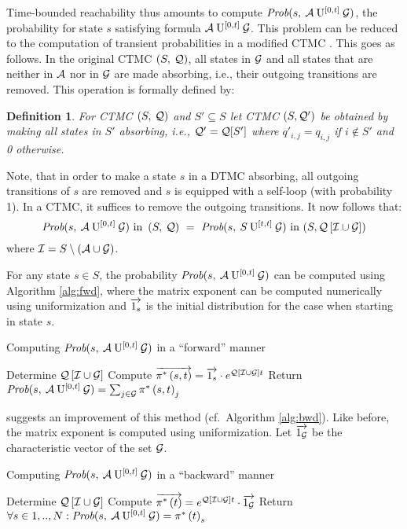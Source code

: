 \documentclass[times, 10pt,twocolumn]{article}
\newtheorem{definition}{Definition}
\begin{document}
		Time-bounded reachability thus amounts to compute $\mbox{\it Prob}(s, \: \mathcal{A} \: \mathrm{U}^{[0,t]} \: \mathcal{G} )$, the probability for state $s$ satisfying formula $\mathcal{A} \: \mathrm{U}^{[0,t]} \: \mathcal{G}$.  This problem can be reduced to the computation of transient probabilities in a modified CTMC \cite{BaierHHK_TSE03}.  This goes as follows.  In the original CTMC $\left( S,\: \mathcal{Q} \right)$, all states in $\mathcal{G}$ and all states that are neither in $\mathcal{A}$ nor in $\mathcal{G}$ are made absorbing, i.e., their outgoing transitions are removed.   This operation is formally defined by:		
		\begin{definition}
		For CTMC $\left( S,\: \mathcal{Q} \right)$ and $S' \subseteq S$ let CTMC $(S, \mathcal{Q}')$  be obtained by making all states in $S'$ absorbing, i.e., $\mathcal{Q}' = \mathcal{Q}[S']$ where $q'_{i,j} = q_{i,j}$ if $i \not\in S'$ and 0 otherwise.
		\end{definition}
		Note, that in order to make a state $s$ in a DTMC absorbing, all outgoing transitions of $s$ are removed and $s$ is equipped with a self-loop (with probability 1).  In a CTMC, it suffices to remove the outgoing transitions.  It now follows that:
		{\small
		\[
			\PsaUg{s}{0}{t} \mbox{ in } \CTMC \ = \ \PsSUg{s}{t}{t} \mbox{ in } (S, \mQnavg)
		\]
		}
		where $\mathcal{I}=S \setminus \left( \mathcal{A} \cup \mathcal{G}\right)$.
		
		For any state $s \in S$, the probability $\mbox{\it Prob}(s, \: \mathcal{A} \: \mathrm{U}^{[0,t]} \: \mathcal{G} )$ can be computed using Algorithm \ref{alg:fwd}, where the matrix exponent can be computed numerically using uniformization and $\overrightarrow{1_{s} }$ is the initial distribution for the case when starting in state $s$.
		\begin{algorithm}
			\caption{Computing $\mbox{\it Prob}(s, \: \mathcal{A} \: \mathrm{U}^{[0,t]} \: \mathcal{G} )$ in a ``forward'' manner}
			\label{alg:fwd}
			\begin{algorithmic}[1]
				\STATE Determine $\mathcal{Q}\left[ \mathcal{I} \cup \mathcal{G} \right]$
				\STATE Compute $\overrightarrow{\pi^{*} \left(s, t \right)} = \overrightarrow{1_{s} } \cdot e^{\mathcal{Q}\left[ \mathcal{I} \cup \mathcal{G} \right] t}$
				\STATE Return $\mbox{\it Prob}(s, \: \mathcal{A} \: \mathrm{U}^{[0,t]} \: \mathcal{G} ) = \sum_{j \in \mathcal{G}}\pi^{*} \left(s, t \right)_{j}$
			\end{algorithmic}
		\end{algorithm}
		\cite{KatoenKNP_LNCS01} suggests an improvement of this method (cf.\ Algorithm \ref{alg:bwd}).  Like before, the matrix exponent is computed using uniformization.  Let $\overrightarrow{1_{\mathcal{G}}}$ be the characteristic vector of the set $\mathcal{G}$.

		\begin{algorithm}
			\caption{Computing $\mbox{\it Prob}(s, \: \mathcal{A} \: \mathrm{U}^{[0,t]} \: \mathcal{G} )$ in a ``backward'' manner}
			\label{alg:bwd}
			\begin{algorithmic}[1]
				\STATE Determine $\mathcal{Q}\left[ \mathcal{I} \cup \mathcal{G} \right]$
				\STATE Compute $\overrightarrow{\pi^{*} \left( t \right)} = e^{\mathcal{Q}\left[ \mathcal{I} \cup \mathcal{G} \right] t} \cdot \overrightarrow{1_{\mathcal{G}}}$
				\STATE Return $\forall s \in 1,..,N : \mbox{\it Prob}(s, \: \mathcal{A} \: \mathrm{U}^{[0,t]} \: \mathcal{G} ) = \pi^{*} \left( t \right)_{s}$
			\end{algorithmic}
		\end{algorithm}
	
\end{document}
